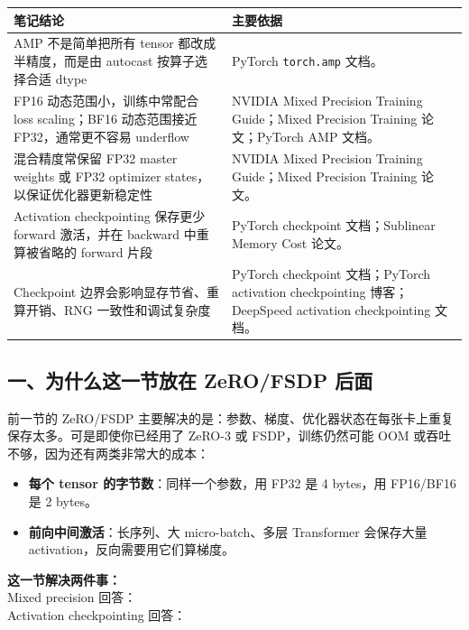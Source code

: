 \begin{center}
{\small
\begin{tabular}{p{4cm}p{8.7cm}}
\hline
\textbf{笔记结论} & \textbf{主要依据} \\
\hline
AMP 不是简单把所有 tensor 都改成半精度，而是由 autocast 按算子选择合适 dtype & PyTorch \texttt{torch.amp} 文档。 \\
FP16 动态范围小，训练中常配合 loss scaling；BF16 动态范围接近 FP32，通常更不容易 underflow & NVIDIA Mixed Precision Training Guide；Mixed Precision Training 论文；PyTorch AMP 文档。 \\
混合精度常保留 FP32 master weights 或 FP32 optimizer states，以保证优化器更新稳定性 & NVIDIA Mixed Precision Training Guide；Mixed Precision Training 论文。 \\
Activation checkpointing 保存更少 forward 激活，并在 backward 中重算被省略的 forward 片段 & PyTorch checkpoint 文档；Sublinear Memory Cost 论文。 \\
Checkpoint 边界会影响显存节省、重算开销、RNG 一致性和调试复杂度 & PyTorch checkpoint 文档；PyTorch activation checkpointing 博客；DeepSpeed activation checkpointing 文档。 \\
\hline
\end{tabular}
}
\end{center}

\subsection{一、为什么这一节放在 ZeRO/FSDP 后面}

前一节的 ZeRO/FSDP 主要解决的是：参数、梯度、优化器状态在每张卡上重复保存太多。可是即使你已经用了 ZeRO-3 或 FSDP，训练仍然可能 OOM 或吞吐不够，因为还有两类非常大的成本：

\begin{itemize}[leftmargin=1.5em]
  \item \textbf{每个 tensor 的字节数}：同样一个参数，用 FP32 是 4 bytes，用 FP16/BF16 是 2 bytes。
  \item \textbf{前向中间激活}：长序列、大 micro-batch、多层 Transformer 会保存大量 activation，反向需要用它们算梯度。
\end{itemize}

\begin{summarybox}
\textbf{这一节解决两件事：}\\
Mixed precision 回答：\\
Activation checkpointing 回答：
\end{summarybox}

